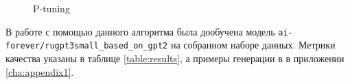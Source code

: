 \begin{figure}[ht]
  \centering
  \caption{P-tuning}
  \label{fig:p_tuning}
\end{figure}

В работе с помощью данного алгоритма была дообучена модель \texttt{ai-forever/rugpt3small\_based\_on\_gpt2} на собранном наборе данных.
Метрики качества указаны в таблице \ref{table:results}, а примеры генерации в  в приложении \ref{cha:appendix1}.
